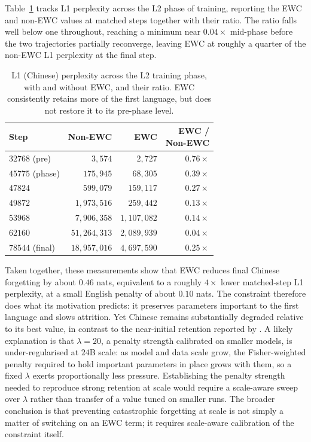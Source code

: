 Table~\ref{tab:ewc-retention} tracks L1 perplexity across the L2 phase
of training, reporting the EWC and non-EWC values at matched steps
together with their ratio. The ratio falls well below one throughout,
reaching a minimum near $0.04\times$ mid-phase before the two
trajectories partially reconverge, leaving EWC at roughly a quarter of
the non-EWC L1 perplexity at the final step.

\begin{table}[t]
\centering
\small
\begin{adjustbox}{max width=\columnwidth}
\begin{tabular}{@{}lrrr@{}}
\toprule
Step & Non-EWC & EWC & \makecell[r]{EWC /\\Non-EWC} \\
\midrule
$32768$ (pre)    & $3{,}574$       & $2{,}727$       & $0.76\times$ \\
$45775$ (phase)  & $175{,}945$     & $68{,}305$      & $0.39\times$ \\
$47824$          & $599{,}079$     & $159{,}117$     & $0.27\times$ \\
$49872$          & $1{,}973{,}516$ & $259{,}442$     & $0.13\times$ \\
$53968$          & $7{,}906{,}358$ & $1{,}107{,}082$ & $0.14\times$ \\
$62160$          & $51{,}264{,}313$& $2{,}089{,}939$ & $0.04\times$ \\
$78544$ (final)  & $18{,}957{,}016$& $4{,}697{,}590$ & $0.25\times$ \\
\bottomrule
\end{tabular}
\end{adjustbox}
\caption{L1 (Chinese) perplexity across the L2 training phase, with and
without EWC, and their ratio. EWC consistently retains more of the
first language, but does not restore it to its pre-phase level.}
\label{tab:ewc-retention}
\end{table}

Taken together, these measurements show that EWC reduces final Chinese
forgetting by about $0.46$ nats, equivalent to a roughly $4\times$
lower matched-step L1 perplexity, at a small English penalty of about
$0.10$ nats. The constraint therefore does what its motivation predicts:
it preserves parameters important to the first language and slows
attrition. Yet Chinese remains substantially degraded relative to its
best value, in contrast to the near-initial retention reported by
\citet{constantinescu2025investigating}. A likely explanation is that
$\lambda = 20$, a penalty strength calibrated on smaller models, is
under-regularised at $24$B scale: as model and data scale grow, the
Fisher-weighted penalty required to hold important parameters in place
grows with them, so a fixed $\lambda$ exerts proportionally less
pressure. Establishing the penalty strength needed to reproduce strong
retention at scale would require a scale-aware sweep over $\lambda$
rather than transfer of a value tuned on smaller runs. The broader
conclusion is that preventing catastrophic forgetting at scale is not
simply a matter of switching on an EWC term; it requires scale-aware
calibration of the constraint itself.

